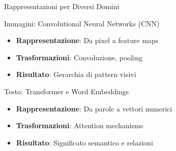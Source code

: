 \documentclass[aspectratio=169]{beamer}
\begin{document}
%
%
\begin{frame}{Rappresentazioni per Diversi Domini}

\begin{block}{Immagini: Convolutional Neural Networks (CNN)}
\begin{itemize}
\item \textbf{Rappresentazione}: Da pixel a feature maps
\item \textbf{Trasformazioni}: Convoluzione, pooling
\item \textbf{Risultato}: Gerarchia di pattern visivi
\end{itemize}
\end{block}

\begin{block}{Testo: Transformer e Word Embeddings}
\begin{itemize}
\item \textbf{Rappresentazione}: Da parole a vettori numerici  
\item \textbf{Trasformazioni}: Attention mechanisms
\item \textbf{Risultato}: Significato semantico e relazioni
\end{itemize}
\end{block}
\end{frame}
%
%
\end{document}
